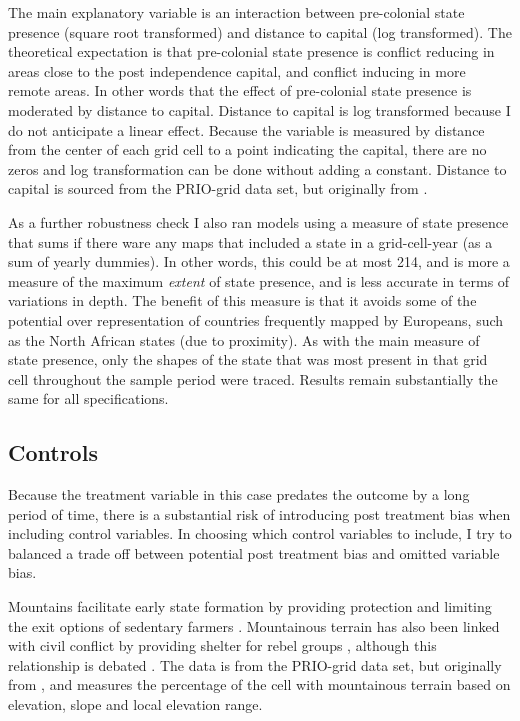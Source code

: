 \documentclass[12pt]{article}
\begin{document}
The main explanatory variable is an interaction between pre-colonial state
presence (square root transformed) and distance to capital (log transformed).
The theoretical expectation is that pre-colonial state presence is conflict
reducing in areas close to the post independence capital, and conflict inducing
in more remote areas. In other words that the effect of pre-colonial state
presence is moderated by distance to capital. Distance to capital is log
transformed because I do not anticipate a linear effect. Because the variable is
measured by distance from the center of each grid cell to a point indicating the
capital, there are no zeros and log transformation can be done without adding a
constant. Distance to capital is sourced from the PRIO-grid data set, but
originally from \citet{Weidmann2010a}.

As a further robustness check I also ran models using a measure of state
presence that sums if there ware any maps that included a state in a
grid-cell-year (as a sum of yearly dummies). In other words, this could be at
most 214, and is more a measure of the maximum \textit{extent} of state
presence, and is less accurate in terms of variations in depth. The benefit of
this measure is that it avoids some of the potential over representation of
countries frequently mapped by Europeans, such as the North African states (due
to proximity). As with the main measure of state presence, only the shapes of
the state that was most present in that grid cell throughout the sample period
were traced. Results remain substantially the same for all specifications.

\subsection{Controls} \label{Controls}

Because the treatment variable in this case predates the outcome by a long
period of time, there is a substantial risk of introducing post treatment bias
when including control variables. In choosing which control variables to
include, I try to balanced a trade off between potential post treatment bias
and omitted variable bias. 

Mountains facilitate early state formation by providing protection and limiting the
exit options of sedentary farmers \citep{Carneiro1988}. Mountainous terrain has
also been linked with civil conflict by providing shelter for rebel groups
\citep{Hegre2006}, although this relationship is debated \citep{Buhaug2002}. The
data is from the PRIO-grid data set, but originally from \citet{Blyth2002}, and
measures the percentage of the cell with mountainous terrain based on elevation,
slope and local elevation range.
\end{document}

